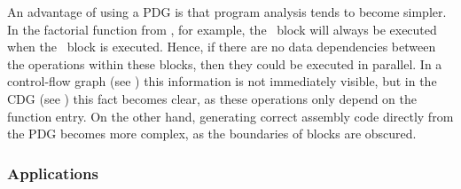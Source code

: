 %
%      
%      
%      
%

An advantage of using a \gls{PDG} is that \gls{program} analysis tends to become
simpler.
%
In the factorial \gls{function} from , for
example, the ~\gls{block} will always be executed when the
~\gls{block} is executed.
%
Hence, if there are no data
dependencies between the operations within these \glspl{block}, then they could
be executed in parallel.
%
In a \gls{control-flow graph} (see
) this information is not immediately visible, but
in the \gls{CDG} (see ) this fact becomes clear,
as these operations only depend on the \gls{function} entry.
%
On the other hand,
generating correct \gls{assembly code} directly from the \gls{PDG} becomes more
complex, as the boundaries of \glspl{block} are obscured.


\subsubsection{Applications}

